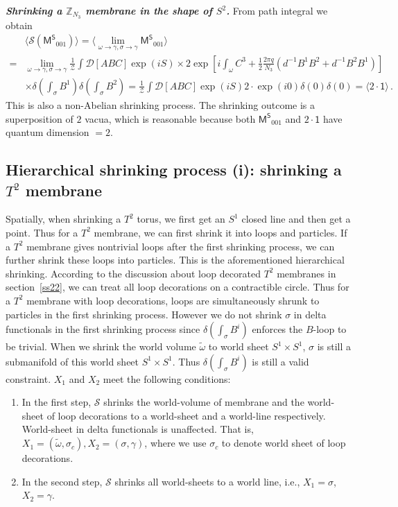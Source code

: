 \documentclass[11pt,nofootinbib,preprint]{revtex4-1}
\begin{document}
\textbf{\textit{Shrinking a $\mathbb{Z}_{N_3}$ membrane in the shape of $S^2$.}}
From path integral we obtain 
\begin{align}
&	\langle \mathcal{S} \left( \mathsf{M^S}_{001} \right) \rangle 	=\langle \underset{\omega \rightarrow \gamma, \sigma \rightarrow \gamma}{\lim}\mathsf{M^S}_{001} \rangle \nonumber
	\\
	=&\underset{\omega \rightarrow \gamma, \sigma \rightarrow \gamma}{\lim}\frac{1}{\mathcal{Z}}\int{\mathcal{D} \left[ ABC \right] \exp \left( iS \right)}
	\times 2\exp \left[ i\int_{\omega}{C^3+\frac{1}{2}\frac{2\pi q}{N_3}\left( d^{-1}B^1B^2+d^{-1}B^2B^1 \right)} \right]  \nonumber
	\\
	&\times \delta \left( \int_{\sigma}{B^1} \right) \delta \left( \int_{\sigma }{B^2} \right) =\frac{1}{\mathcal{Z}}\int{\mathcal{D} \left[ ABC\right] \exp \left( iS \right) 2\cdot\exp \left( i0 \right) \delta \left( 0 \right) \delta \left( 0 \right)}=\langle 2\cdot\mathsf{1} \rangle \,.
\end{align}
This is also a non-Abelian shrinking process. The shrinking outcome is a superposition of $2$ vacua, which is reasonable because both $\mathsf{M^S}_{001}$ and $2\cdot\mathsf{1}$ have quantum dimension $=2$. 



\subsection{Hierarchical shrinking process (i): shrinking a   $T^2$ membrane\label{section_shrinking_hier}}
Spatially, when shrinking a $T^2$ torus, we first get an $S^1$ closed line and then get a point. Thus for a $T^2$ membrane, we can first shrink it into loops and particles. If a $T^2$ membrane gives nontrivial loops after the first shrinking process, we can further shrink these loops into  particles. This is the aforementioned hierarchical shrinking. According to the discussion about loop decorated $T^2$ membranes in section~\ref{ss22}, we can treat all loop decorations on a contractible circle. Thus for a $T^2$ membrane with loop decorations, loops are simultaneously shrunk to particles in the first shrinking process. However we do not shrink $\sigma$ in delta functionals in the first shrinking process since $\delta \left( \int_{\sigma}{B^i} \right)$ enforces the $B$-loop to be trivial. When we shrink the world volume $\tilde{\omega}$ to world sheet $S^1\times S^1$, $\sigma$ is still a submanifold of this world sheet $S^1\times S^1$. Thus $\delta \left( \int_{\sigma}{B^i} \right)$ is still a valid constraint. $X_1$ and $X_2$ meet the following conditions:
\begin{enumerate}
	\item In the first step, $\mathcal{S}$ shrinks the world-volume of membrane and the world-sheet of loop decorations to a world-sheet and a world-line respectively. World-sheet in delta functionals is unaffected. That is, $X_1=(\tilde{\omega},\sigma_{c}), X_2=(\sigma,\gamma)$, where we use $\sigma_{c}$ to denote world sheet of loop decorations. 
	\item In the second step, $\mathcal{S}$ shrinks all world-sheets
	 to a world line, i.e., $X_1=\sigma$, $X_2=\gamma$.
\end{enumerate}
\end{document}
